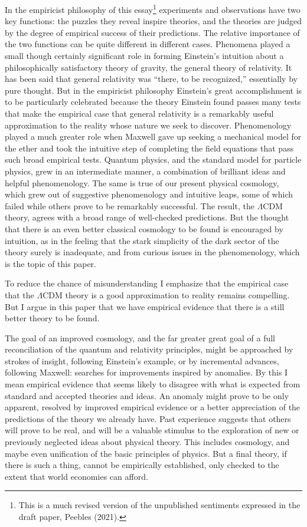 \documentclass[fleqn,usenatbib]{mnras}
\begin{document}
\noindent In the empiricist philosophy of this essay\footnote{This is a much revised version of the unpublished sentiments expressed in the draft paper, Peebles (2021).} experiments and observations have two key functions: the puzzles they reveal inspire theories, and the theories are judged by the degree of empirical success of their predictions. The relative importance of the two functions can be quite different in different cases. Phenomena  played a small though certainly significant role in forming Einstein's intuition about a philosophically satisfactory theory of gravity, the general theory of relativity. It has been said that general relativity was ``there, to be recognized,'' essentially by pure thought. But in the empiricist philosophy Einstein's great accomplishment is to be particularly celebrated because the theory Einstein found passes many tests that make the empirical case that general relativity is a remarkably useful approximation to the reality whose nature we seek to discover. Phenomenology played a much greater role when Maxwell gave up seeking a mechanical model for the ether and took the intuitive step of completing the field equations that pass such broad empirical tests. Quantum physics, and the standard model for particle physics, grew in an intermediate manner, a combination of brilliant ideas and helpful phenomenology. The same is true of our present physical cosmology, which grew out of suggestive phenomenology and intuitive leaps, some of which failed while others prove to be remarkably successful. The result, the $\Lambda$CDM theory, agrees with a broad range of well-checked predictions. But the thought that there is an even better classical cosmology to be found is encouraged by intuition, as in the feeling that the stark simplicity of the dark sector of the theory surely is inadequate, and from curious issues in the phenomenology, which is the topic of this paper. 

To reduce the chance of misunderstanding I emphasize that the empirical case that the  $\Lambda$CDM theory is a good approximation to reality remains compelling. But I argue in this paper that we have empirical evidence that there is a still better theory to be found. 

The goal of an improved cosmology, and the far greater great goal of a full reconciliation of the quantum and relativity principles, might be approached by strokes of insight, following Einstein's example, or by incremental advances, following Maxwell: searches for improvements inspired by anomalies. By this I mean empirical evidence that seems likely to disagree with what is expected from standard and accepted theories and ideas. An anomaly might prove to be only apparent, resolved by improved empirical evidence or a better appreciation of the predictions of the theory we already have. Past experience suggests that others will prove to be real, and will be a valuable stimulus to the exploration of new or previously neglected ideas about physical theory. This includes cosmology, and maybe even unification of the basic principles of physics. But a final theory, if there is such a thing, cannot be empirically established, only checked to the extent that world economies can afford. 
\end{document}
